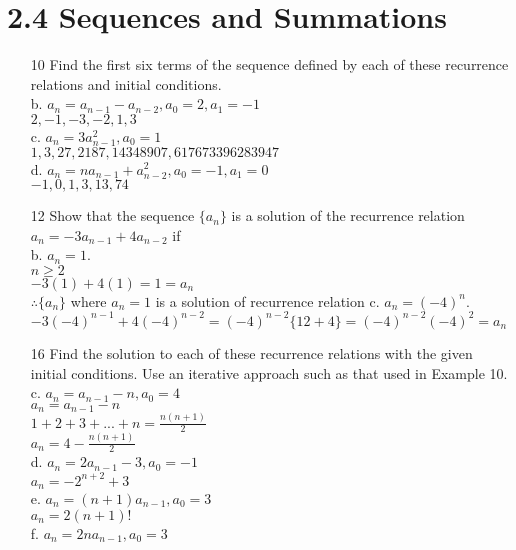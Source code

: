 \documentclass[a4paper]{article}
\newcommand\tab[1][0.5cm]{\hspace*{#1}}
\begin{document}
  \section*{2.4 Sequences and Summations}
  \begin{itemize}
    \item[10] Find the first six terms of the sequence defined by each of these recurrence relations and initial conditions. \\
      b. $a_n = a_{n - 1} - a_{n - 2}, a_0 = 2, a_1 = -1$ \\
      \tab $2, -1, -3, -2, 1, 3$ \\
      c. $a_n = 3a^{2}_{n - 1}, a_0 = 1$ \\
      \tab $1, 3, 27, 2187, 14348907, 617673396283947$ \\
      d. $a_n = na_{n - 1} + a^2_{n - 2}, a_0 = -1, a_1 = 0$ \\
      \tab $-1, 0, 1, 3, 13, 74$
    \item[12] Show that the sequence $\{a_n\}$ is a solution of the recurrence relation $a_n = -3a_{n - 1} + 4a_{n - 2}$ if \\
      b. $a_n = 1$. \\
      \tab $n \geq 2$ \\
      \tab $-3(1) + 4(1) = 1 = a_n$ \\
      \tab $\therefore \{a_n\}$ where $a_n = 1$ is a solution of recurrence relation
      c. $a_n = (-4)^n$. \\
      \tab $-3(-4)^{n - 1} + 4(-4)^{n - 2} = (-4)^{n - 2}\{12 + 4\} = (-4)^{n - 2}(-4)^2 = a_n$
    \item[16] Find the solution to each of these recurrence relations with the given initial conditions. Use an iterative approach such as that used in Example 10. \\
      c. $a_n = a_{n - 1} - n, a_0 = 4$ \\
      \tab $a_n = a_{n - 1} - n$ \\
      \tab $1 + 2 + 3 + ... + n = \frac{n(n + 1)}{2}$ \\
      \tab $a_n = 4 - \frac{n(n + 1)}{2}$ \\
      d. $a_n = 2a_{n - 1} - 3, a_0 = -1$ \\
      \tab $a_n = -2^{n + 2} + 3$ \\
      e. $a_n = (n + 1)a_{n - 1}, a_0 = 3$ \\
      \tab $a_n = 2(n + 1)!$ \\
      f. $a_n = 2na_{n - 1}, a_0 = 3$ \\

\end{itemize}
\end{document}
